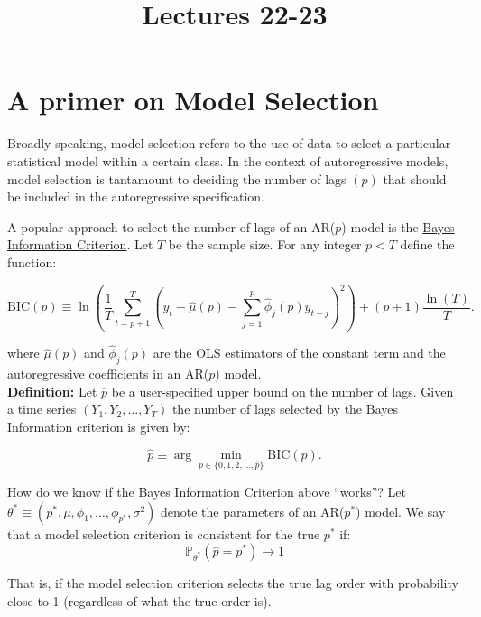 \documentclass[12] {article}
\begin{document}
\onehalfspace

\title{Lectures 22-23}
\date{}
\maketitle


\section{A primer on Model Selection}

Broadly speaking, model selection refers to the use of data to select a particular statistical model within a certain class. In the context of autoregressive models, model selection is tantamount to deciding the number of lags $(p)$ that should be included in the autoregressive specification.

A popular approach to select the number of lags of an AR($p$) model is the \underline{Bayes Information Criterion}. Let $T$ be the sample size. For any integer $p<T$ define the function:

\begin{equation}
\textrm{BIC}(p) \equiv \ln \left( \frac{1}{T} \sum_{t=p+1}^{T} (y_t- \widehat{\mu}(p) - \sum_{j=1}^{p} \widehat{\phi}_j(p) y_{t-j} )^2 \right) + (p+1)\frac{\ln (T)}{T}.
\end{equation}

\noindent where $\widehat{\mu}(p)$ and $\widehat{\phi}_j(p)$ are the OLS estimators of the constant term and the autoregressive coefficients in an AR($p$) model. \\

\noindent \textbf{Definition:} Let $\overline{p}$ be a user-specified upper bound on the number of lags. Given a time series $(Y_1,Y_2, \ldots, Y_{T})$ the number of lags selected by the Bayes Information criterion is given by:

\begin{equation}
\widehat{p} \equiv \arg \min_{p \in \{0, 1,2, \ldots, \overline{p}\}} \textrm{BIC}(p).
\end{equation}

\noindent How do we know if the Bayes Information Criterion above ``works\textquotedblright? Let $\theta^* \equiv (p^*, \mu, \phi_1, \ldots, \phi_{p^*},\sigma^2)$ denote the parameters of an AR($p^*$) model. We say that a model selection criterion is consistent for the true $p^*$ if:
\[ \mathbb{P}_{\theta^*} \left( \widehat{p} = p^* \right) \rightarrow 1 \]

\noindent That is, if the model selection criterion selects the true lag order with probability close to 1 (regardless of what the true order is).  
\end{document}
